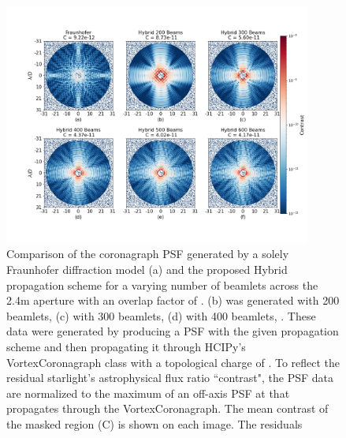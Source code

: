 \begin{figure}[H]
    \centering
    \includegraphics[width=0.9\textwidth, trim={3cm 0cm 2cm 0cm}]{coronagraph_vs_beamlets.png}
    \caption{Comparison of the coronagraph PSF  generated by a solely Fraunhofer diffraction model (a) and the proposed Hybrid propagation scheme for a varying number of beamlets across the 2.4m  aperture with an overlap factor of . (b) was generated with 200 beamlets, (c) with 300 beamlets, (d) with 400 beamlets, . These data were generated by producing a PSF with the given propagation scheme and then propagating it through HCIPy's VortexCoronagraph class with a topological charge of . To reflect the residual starlight's astrophysical flux ratio ``contrast", the PSF data are normalized to the maximum of an off-axis PSF at  that propagates through the VortexCoronagraph. The mean contrast of the masked region (C) is shown on each image. The residuals }
    \label{fig:nonparaxial_coronagraph}
\end{figure}

